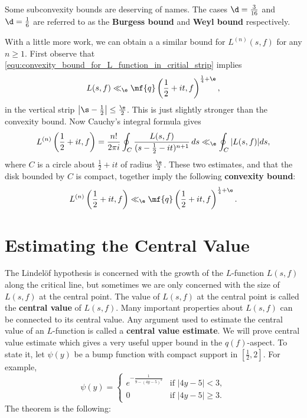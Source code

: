     \begin{remark}
      Some subconvexity bounds are deserving of names. The cases $\d = \frac{3}{16}$ and $\d = \frac{1}{6}$ are referred to as the \textbf{Burgess bound} and \textbf{Weyl bound} respectively.
    \end{remark}
    
    With a little more work, we can obtain a a similar bound for $L^{(n)}(s,f)$ for any $n \ge 1$. First observe that \cref{equ:convexity_bound_for_L_function_in_critial_strip} implies
    \[
      L(s,f) \ll_{\e} \mf{q}\left(\frac{1}{2}+it,f\right)^{\frac{1}{4}+\e},
    \]
    in the vertical strip $\left|\s-\frac{1}{2}\right| \le \frac{\e}{2}$. This is just slightly stronger than the convexity bound. Now Cauchy's integral formula gives
    \[
      L^{(n)}\left(\frac{1}{2}+it,f\right) = \frac{n!}{2\pi i}\oint_{C}\frac{L(s,f)}{(s-\frac{1}{2}-it)^{n+1}}\,ds \ll_{\e} \oint_{C}|L(s,f)|ds,
    \]
    where $C$ is a circle about $\frac{1}{2}+it$ of radius $\frac{\e}{2}$. These two estimates, and that the disk bounded by $C$ is compact, together imply the following \textbf{convexity bound}:
    \[
      L^{(n)}\left(\frac{1}{2}+it,f\right) \ll_{\e} \mf{q}\left(\frac{1}{2}+it,f\right)^{\frac{1}{4}+\e}.
    \]
  \section{Estimating the Central Value}
    The Lindel\"of hypothesis is concerned with the growth of the $L$-function $L(s,f)$ along the critical line, but sometimes we are only concerned with the size of $L(s,f)$ at the central point. The value of $L(s,f)$ at the central point is called the \textbf{central value} of $L(s,f)$. Many important properties about $L(s,f)$ can be connected to its central value. Any argument used to estimate the central value of an $L$-function is called a \textbf{central value estimate}. We will prove central value estimate which gives a very useful upper bound in the $q(f)$-aspect. To state it, let $\psi(y)$ be a bump function with compact support in $\left[\frac{1}{2},2\right]$. For example,
    \[
      \psi(y) = \begin{cases} e^{-\frac{1}{9-(4y-5)^{2}}} & \text{if $|4y-5| < 3$}, \\ 0 & \text{if $|4y-5| \ge 3$}. \end{cases}
    \]
    The theorem is the following:

